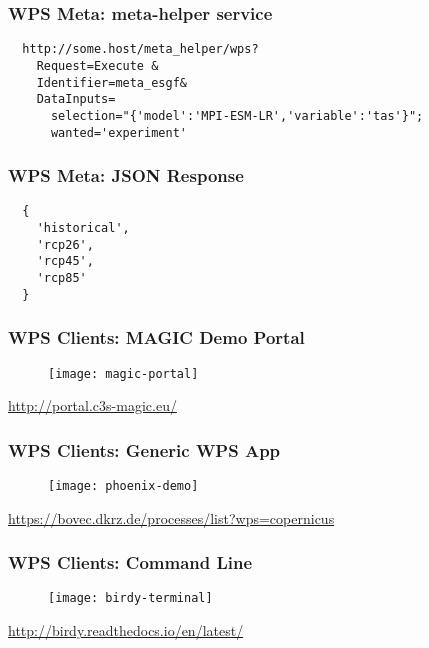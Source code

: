 \documentclass{beamer}
\begin{document}
\begin{frame}[fragile]
\frametitle<presentation>{WPS Meta: meta-helper service}

  \lstset{language=XML}
  \begin{lstlisting}
  http://some.host/meta_helper/wps?
    Request=Execute &
    Identifier=meta_esgf&
    DataInputs=
      selection="{'model':'MPI-ESM-LR','variable':'tas'}";
      wanted='experiment'
  \end{lstlisting}

\end{frame}

\begin{frame}[fragile]
\frametitle<presentation>{WPS Meta: JSON Response}
  \lstset{language=JSON}
  \begin{lstlisting}
  {
    'historical',
    'rcp26',
    'rcp45',
    'rcp85'
  }
  \end{lstlisting}

\end{frame}

\begin{frame}
\frametitle<presentation>{WPS Clients: MAGIC Demo Portal}

  \begin{figure}[ht]
    \centering
    \texttt{[image: magic-portal]}
  \end{figure}

  \centering
  \footnotesize{\url{http://portal.c3s-magic.eu/}}

\end{frame}

\begin{frame}
\frametitle<presentation>{WPS Clients: Generic WPS App}

  \begin{figure}[ht]
    \centering
    \texttt{[image: phoenix-demo]}
  \end{figure}

  \centering
  \footnotesize{\url{https://bovec.dkrz.de/processes/list?wps=copernicus}}

\end{frame}

\begin{frame}
\frametitle<presentation>{WPS Clients: Command Line}

  \begin{figure}[ht]
    \centering
    \texttt{[image: birdy-terminal]}
  \end{figure}

  \centering
  \footnotesize{\url{http://birdy.readthedocs.io/en/latest/}}

\end{frame}
\end{document}
